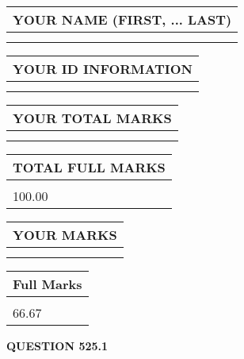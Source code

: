 \documentclass{ctexart}
\begin{document}
   
   
   
\newpage 
\setcounter{page}{ 
   525001 } 
   
   
   
   
\noindent\begin{tabular}{|l|}
\hline
YOUR NAME (FIRST, ... LAST)  \\
\hline
 \\ 
 \\ 
\hline
\end{tabular}
\hspace{0.05in} \begin{tabular}{|l|}
\hline
 YOUR   ID   INFORMATION  \\
\hline
 \\ 
 \\ 
\hline
\end{tabular}
   
   
\vspace{0.2in}\noindent\begin{tabular}{|l|}
\hline
YOUR TOTAL MARKS  \\
\hline
 \\ 
 \\ 
\hline
\end{tabular}
\hspace{0.05in} \begin{tabular}{|l|}
\hline
TOTAL FULL MARKS  \\
\hline
 \\ 
100.00 \\
\hline
\end{tabular}
   
   
 \vspace{0.2in}
 
 
 
 
   
   
  
\vspace{0.2in}
  
\noindent\begin{tabular}{|l|}
\hline
 YOUR MARKS  \\
\hline
 \\ 
 \\ 
\hline
\end{tabular}
\hspace{0.05in} \begin{tabular}{|l|}
\hline
 Full Marks  \\
\hline
 \\ 
66.67 \\
\hline
\end{tabular}
{\textbf{\Large{QUESTION
525.1 
}}}
  
\end{document}
